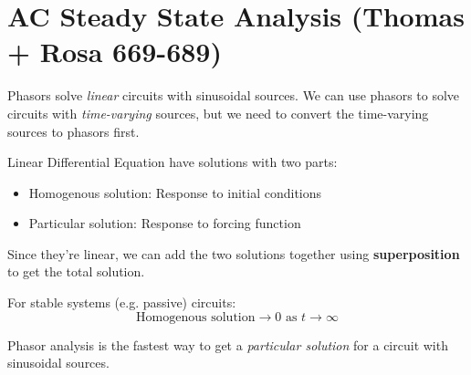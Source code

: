 \chapter{AC Steady State Analysis (Thomas + Rosa 669-689)}


\begin{vocabulary}
    [Phasor]
    Phasors solve \textit{linear} circuits with sinusoidal sources. We can use phasors to solve circuits with \textit{time-varying} sources, but we need to convert the time-varying sources to phasors first.
\end{vocabulary}
\begin{remark}
    Linear Differential Equation have solutions with two parts:
    \begin{itemize}
        \item Homogenous solution: Response to initial conditions
        \item Particular solution: Response to forcing function
    \end{itemize}
    Since they're linear, we can add the two solutions together using \textbf{superposition} to get the total solution.
\end{remark}

\begin{corollary}
    For stable systems (e.g. passive) circuits:
    \[
        \text{Homogenous solution} \to 0 \text{ as } t \to \infty
    \]
\end{corollary}

\begin{remark}
    Phasor analysis is the fastest way to get a \textit{particular solution} for a circuit with sinusoidal sources.
\end{remark}

